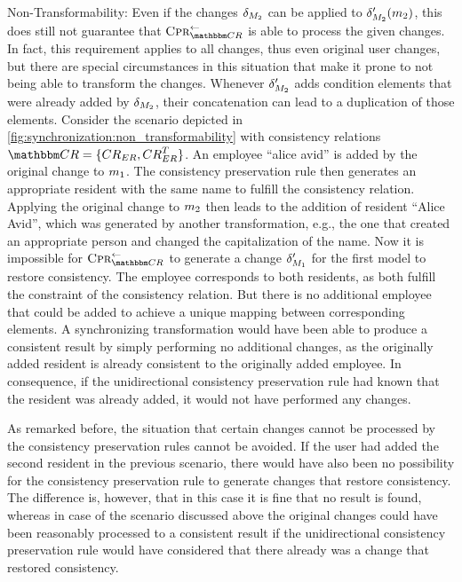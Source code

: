 \begin{properdescription}
    \item[Non-Transformability:] Even if the changes $\change{\metamodel{M}{2}}$ can be applied to $\change{\metamodel{M}{2}}'(\model{m}{2})$, this does still not guarantee that $\consistencypreservationrule{\consistencyrelationset{CR}}^{\leftarrow}$ is able to process the given changes.
    In fact, this requirement applies to all changes, thus even original user changes, but there are special circumstances in this situation that make it prone to not being able to transform the changes.
    Whenever $\change{\metamodel{M}{2}}'$ adds condition elements that were already added by $\change{\metamodel{M}{2}}$, their concatenation can lead to a duplication of those elements.
    Consider the scenario depicted in \autoref{fig:synchronization:non_transformability} with consistency relations $\consistencyrelationset{CR} = \setted{\consistencyrelation{CR}{ER}, \consistencyrelation{CR}{ER}^T}$. 
    An employee \enquote{alice avid} is added by the original change to $\model{m}{1}$.
    The consistency preservation rule then generates an appropriate resident with the same name to fulfill the consistency relation.
    Applying the original change to $\model{m}{2}$ then leads to the addition of resident \enquote{Alice Avid}, which was generated by another transformation, e.g., the one that created an appropriate person and changed the capitalization of the name.
    Now it is impossible for $\consistencypreservationrule{\consistencyrelationset{CR}}^{\leftarrow}$ to generate a change $\change{\metamodel{M}{1}}'$ for the first model to restore consistency. The employee corresponds to both residents, as both fulfill the constraint of the consistency relation. 
    But there is no additional employee that could be added to achieve a unique mapping between corresponding elements.
    A synchronizing transformation would have been able to produce a consistent result by simply performing no additional changes, as the originally added resident is already consistent to the originally added employee.
    In consequence, if the unidirectional consistency preservation rule had known that the resident was already added, it would not have performed any changes.
\end{properdescription}

As remarked before, the situation that certain changes cannot be processed by the consistency preservation rules cannot be avoided. 
If the user had added the second resident in the previous scenario, there would have also been no possibility for the consistency preservation rule to generate changes that restore consistency.
The difference is, however, that in this case it is fine that no result is found, whereas in case of the scenario discussed above the original changes could have been reasonably processed to a consistent result if the unidirectional consistency preservation rule would have considered that there already was a change that restored consistency.

